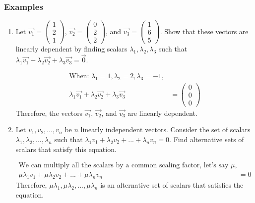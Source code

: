 \documentclass{article}
\begin{document}
\subsubsection*{Examples}
\begin{enumerate}
    \item Let $\vec{v_1} = \begin{pmatrix} 1 \\ 2 \\ 1 \end{pmatrix}$, $\vec{v_2} = \begin{pmatrix} 0 \\ 2 \\ 2 \end{pmatrix}$, and $\vec{v_3} = \begin{pmatrix} 1 \\ 6 \\ 5 \end{pmatrix}$. Show that these vectors are linearly dependent by finding scalars $\lambda_1, \lambda_2, \lambda_3$ such that $\lambda_1 \vec{v_1} + \lambda_2 \vec{v_2} + \lambda_3 \vec{v_3} = \vec{0}$.

          \begin{align*}
              \text{When: } \lambda_1 = 1, \lambda_2 = 2, \lambda_3 = -1,                                                   \\
              \lambda_1 \vec{v_1} + \lambda_2 \vec{v_2} + \lambda_3 \vec{v_3} & = \begin{pmatrix} 0 \\ 0 \\ 0 \end{pmatrix}
          \end{align*}
          Therefore, the vectors $\vec{v_1}$, $\vec{v_2}$, and $\vec{v_3}$ are linearly dependent.

    \item Let $v_1, v_2, ..., v_n$ be $n$ linearly independent vectors. Consider the set of scalars $\lambda_1, \lambda_2, ..., \lambda_n$ such that $\lambda_1 v_1 + \lambda_2 v_2 + ... + \lambda_n v_n = 0$. Find alternative sets of scalars that satisfy this equation.

          \begin{align*}
              \text{We can multiply all the scalars by a common scaling factor, let's say } \mu, \\
              \mu \lambda_1 v_1 + \mu \lambda_2 v_2 + ... + \mu \lambda_n v_n & = 0
          \end{align*}
          Therefore, $\mu \lambda_1, \mu \lambda_2, ..., \mu \lambda_n$ is an alternative set of scalars that satisfies the equation.
\end{enumerate}
\end{document}
